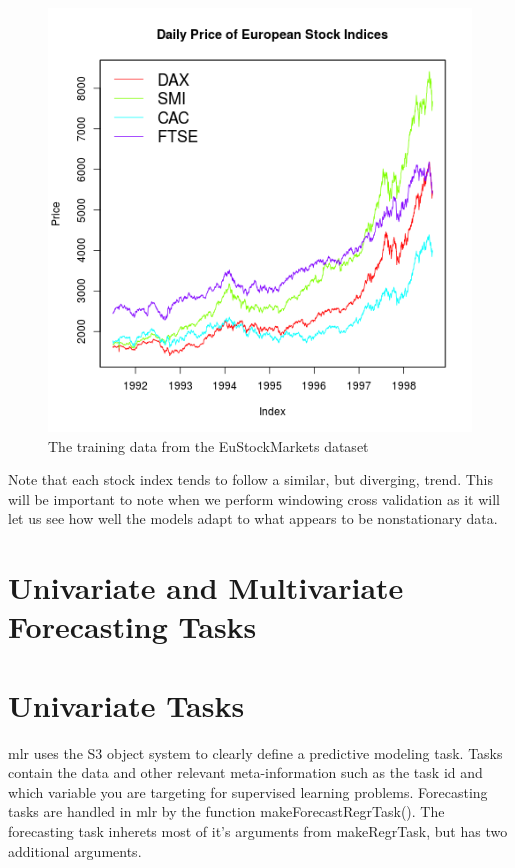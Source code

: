 \documentclass[12pt]{article}\usepackage[]{graphicx}\usepackage[]{color}
\makeatletter
\theoremstyle{definition}
\newcommand\code{\@codex}
\def\@codex#1{{\normalfont\ttfamily\hyphenchar\font=-1 #1}}
\newcommand{\pkg}[1]{{\fontseries{b}\selectfont #1}}
\makeatother
\begin{document}
\begin{figure}[H]
\includegraphics[width=\linewidth]{plot_eu_train.png}
\centering
\caption{The training data from the EuStockMarkets dataset}
\label{fig:eu_train}
\end{figure}

\doublespacing

Note that each stock index tends to follow a similar, but diverging, trend. This will be important to note when we perform windowing cross validation as it will let us see how well the models adapt to what appears to be nonstationary data.

\section{Univariate and Multivariate Forecasting Tasks}
\label{sec:task}

\section{Univariate Tasks}
\label{sec:univarTask}
\pkg{mlr} uses the S3 object system to clearly define a predictive modeling task. Tasks contain the data and other relevant meta-information such as the task id and which variable you are targeting for supervised learning problems. Forecasting tasks are handled in \pkg{mlr} by the function \code{makeForecastRegrTask()}. The forecasting task inherets most of it's arguments from \code{makeRegrTask}, but has two additional arguments.
\end{document}
